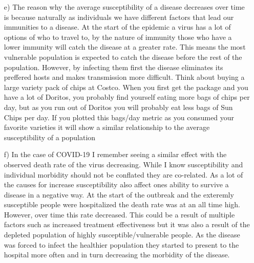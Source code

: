 \documentclass{report}
\begin{document}
\begin{itemize}
         \item[e)]{The reason why the average susceptibility of a disease decreases over time is because naturally as individuals we have different factors that lead our immunities to a disease. At the start of the epidemic a virus has a lot of options of who to travel to, by the nature of immunity those who have a lower immunity will catch the disease at a greater rate. This means the most vulnerable population is expected to catch the disease before the rest of the population. However, by infecting them first the disease eliminates its preffered hosts and makes transmission more difficult. Think about buying a large variety pack of chips at Costco. When you first get the package and you have a lot of Doritos, you probably find yourself eating more bags of chips per day, but as you run out of Doritos you will probably eat less bags of Sun Chips per day. If you plotted this bags/day metric as you consumed your favorite varieties it will show a similar relationship to the average susceptibility of a population}
         \item[f)]{In the case of COVID-19 I remember seeing a similar effect with the observed death rate of the virus decreasing. While I know susceptibility and individual morbidity should not be conflated they are co-related. As a lot of the causes for increase susceptibility also affect ones ability to survive a disease in a negative way. At the start of the outbreak and the exteremly susceptible people were hospitalized the death rate was at an all time high. However, over time this rate decreased. This could be a result of multiple factors such as increased treatment effectiveness but it was also a result of the depleted population of highly susceptible/vulnerable people. As the disease was forced to infect the healthier population they started to present to the hospital more often and in turn decreasing the morbidity of the disease.}
\end{itemize}
\newpage
{}
\end{document}
